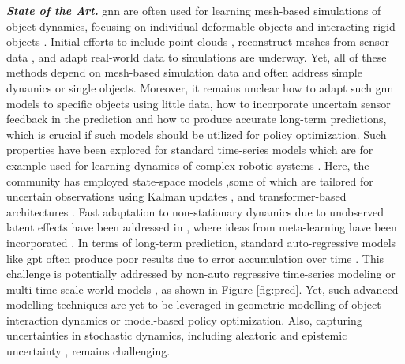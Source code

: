 \documentclass{erc-B2}
\begin{document}
\textit{\textbf{State of the Art.}} \gls*{gnn} are often used for learning mesh-based simulations of object dynamics, focusing on individual deformable objects \cite{pfaff2021learning} and interacting rigid objects \cite{allen2023learning}. Initial efforts to include point clouds \cite{linkerhagnerFSM23, shi2023robocook}, reconstruct meshes from sensor data \cite{longhini2023edo}, and adapt real-world data to simulations \cite{sundaresan2022diffcloud, antonova2022bayesian} are underway. Yet, all of these methods depend on mesh-based simulation data and often address simple dynamics or single objects. Moreover, it remains unclear how to adapt such \gls*{gnn} models to specific objects using little data, how to incorporate uncertain sensor feedback in the prediction and how to produce accurate long-term predictions, which is crucial if such models should be utilized for policy optimization. 
Such properties have been explored for standard time-series models which are for example used for learning dynamics of complex robotic systems \cite{shaj2020acrkn}. Here, the community has employed state-space models \cite{gu2021efficiently, smith2022simplified, becker19RKN},some of which are tailored for uncertain observations using Kalman updates \cite{kalman1960,becker19RKN}, and transformer-based architectures \cite{vaswani2017attention,zhou2021informer,liu2022Transformer}. Fast adaptation to non-stationary dynamics due to unobserved latent effects have been addressed in \cite{shaj2022hiprssm,liu2022Transformer}, where ideas from meta-learning have been incorporated \cite{shaj2022hiprssm}. In terms of long-term prediction, standard auto-regressive models like \gls*{gpt} often produce poor results due to error accumulation over time \cite{lecun2022path,zeng2018learning}. This challenge is potentially addressed by non-auto regressive time-series modeling \cite{Zeng2022AreTE} or multi-time scale world models \cite{shaj2023mts3}, as shown in Figure \ref{fig:pred}. %
Yet, such advanced modelling techniques  are yet to be leveraged in geometric modelling of  object interaction dynamics  or model-based policy optimization. Also, capturing uncertainties in stochastic dynamics, including aleatoric \cite{becker19RKN} and epistemic uncertainty \cite{chua2018deep,becker2022uncertainty}, remains challenging.  %
\end{document}
